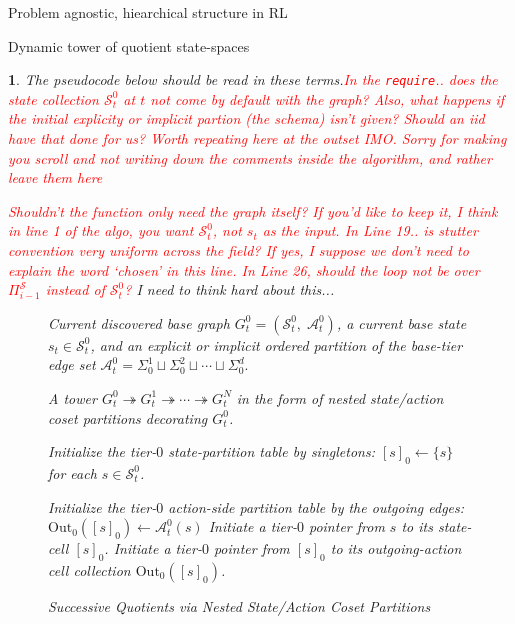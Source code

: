 \documentclass[11pt]{article}
\newtheorem{ermark}[subsubsection]{}
\begin{document}
\begin{section}{Problem agnostic, hiearchical structure in RL}
\begin{subsection}{Dynamic tower of quotient state-spaces}
\begin{ermark}
The pseudocode below should be read in these terms.\textcolor{red}{In the \texttt{require}.. does the state collection $\mathcal{S}^0_t$ at $t$ not come by default with the graph? Also, what happens if the initial explicity or implicit partion (the schema) isn't given? Should an iid have that done for us? Worth repeating here at the outset IMO. Sorry for making you scroll and not writing down the comments inside the algorithm, and rather leave them here}

\textcolor{red}{Shouldn't the function only need the graph itself? If you'd like to keep it, I think in line 1 of the algo, you want $\mathcal{S}^0_t$, not $s_t$ as the input. In Line 19.. is stutter convention very uniform across the field? If yes, I suppose we don't need to explain the word `chosen' in this line. In Line 26, should the loop not be over $\Pi^{\mathcal{S}}_{i-1}$ instead of $\mathcal{S}_t^0$?}
{\color{blue} I need to think hard about this...}

\begin{figure}[!h]
\begin{algorithm}[H]
\caption{Successive Quotients via Nested State/Action Coset Partitions}
\label{alg: successive_quotients_nested_cosets}
\begin{algorithmic}[1]

\Require
Current discovered base graph $G_t^0=(\mathcal{S}_t^0,\;\mathcal{A}_t^0)$,
a current base state $s_t\in \mathcal{S}_t^0$, and an explicit or implicit ordered partition of the base-tier edge set
$
\mathcal{A}_t^0
=
\Sigma_0^1 \sqcup \Sigma_0^2 \sqcup \cdots \sqcup \Sigma_0^d.
$

\Ensure
A tower $G_t^0 \twoheadrightarrow G_t^1 \twoheadrightarrow \cdots \twoheadrightarrow G_t^N$ in the form of nested state/action coset partitions decorating $G_t^0$.

\Statex




    \State Initialize the tier-$0$ state-partition table by singletons:
    $
    [s]_0 \gets \{s\}
    $
    for each $s\in\mathcal{S}_t^0$.

    \State Initialize the tier-$0$ action-side partition table by the outgoing edges:
    $
    \mathrm{Out}_0([s]_0)\gets \mathcal{A}_t^0(s)
    $
        \State Initiate a tier-$0$ pointer from $s$ to its state-cell $[s]_0$.
        \State Initiate a tier-$0$ pointer from $[s]_0$ to its outgoing-action cell collection $\mathrm{Out}_0([s]_0)$.
    \EndFor


\end{algorithmic}
\end{algorithm}
\end{figure}
\end{ermark}
\end{subsection}
\end{section}
\end{document}
